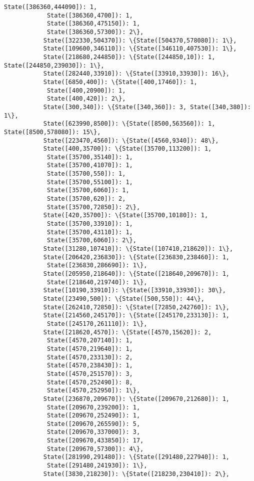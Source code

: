 \documentclass[11pt]{article}
\begin{document}
\begin{Verbatim}[commandchars=\\\{\}]
            State([386360,444090]): 1,
            State([386360,4700]): 1,
            State([386360,475150]): 1,
            State([386360,57300]): 2\},
           State([322330,504370]): \{State([504370,578080]): 1\},
           State([109600,346110]): \{State([346110,407530]): 1\},
           State([218680,244850]): \{State([244850,10]): 1, State([244850,239030]): 1\},
           State([282440,33910]): \{State([33910,33930]): 16\},
           State([6850,400]): \{State([400,17460]): 1,
            State([400,20900]): 1,
            State([400,420]): 2\},
           State([300,340]): \{State([340,360]): 3, State([340,380]): 1\},
           State([623990,8500]): \{State([8500,563560]): 1, State([8500,578080]): 15\},
           State([223470,4560]): \{State([4560,9340]): 48\},
           State([400,35700]): \{State([35700,113200]): 1,
            State([35700,35140]): 1,
            State([35700,41070]): 1,
            State([35700,550]): 1,
            State([35700,55100]): 1,
            State([35700,6060]): 1,
            State([35700,620]): 2,
            State([35700,72850]): 2\},
           State([420,35700]): \{State([35700,10180]): 1,
            State([35700,33910]): 1,
            State([35700,43110]): 1,
            State([35700,6060]): 2\},
           State([31280,107410]): \{State([107410,218620]): 1\},
           State([206420,236830]): \{State([236830,238460]): 1,
            State([236830,286690]): 1\},
           State([205950,218640]): \{State([218640,209670]): 1,
            State([218640,219740]): 1\},
           State([10190,33910]): \{State([33910,33930]): 30\},
           State([23490,500]): \{State([500,550]): 44\},
           State([262410,72850]): \{State([72850,242760]): 1\},
           State([214560,245170]): \{State([245170,233130]): 1,
            State([245170,261110]): 1\},
           State([218620,4570]): \{State([4570,15620]): 2,
            State([4570,207140]): 1,
            State([4570,219640]): 1,
            State([4570,233130]): 2,
            State([4570,238430]): 1,
            State([4570,251570]): 3,
            State([4570,252490]): 8,
            State([4570,252950]): 1\},
           State([236870,209670]): \{State([209670,212680]): 1,
            State([209670,239200]): 1,
            State([209670,252490]): 1,
            State([209670,265590]): 5,
            State([209670,337000]): 3,
            State([209670,433850]): 17,
            State([209670,57300]): 4\},
           State([281990,291480]): \{State([291480,227940]): 1,
            State([291480,241930]): 1\},
           State([3830,218230]): \{State([218230,230410]): 2\},

\end{Verbatim}
\end{document}
